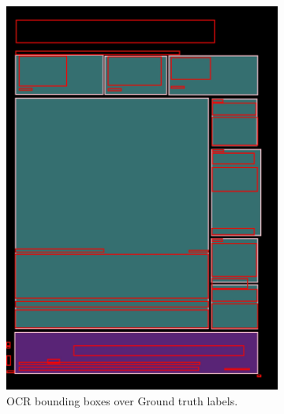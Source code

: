 \documentclass[oneside, english, bibtex]{kththesis}
\begin{document}
\begin{figure}[!htb]
\begin{adjustbox}{center,max size={\textwidth}{0.9\textheight}}
{\begin{subfigure}{0.6\textwidth}
\includegraphics[width=\linewidth]{figures/ocr_bbox/JIefsDa.jpg}
  \caption{OCR bounding boxes over Ground truth labels.}
  \label{fig:JIefsDa_GTbb}
\end{subfigure}
\begin{subfigure}{0.6\textwidth}
  \centering

\end{subfigure}}
\end{adjustbox}
\end{figure}
\end{document}
